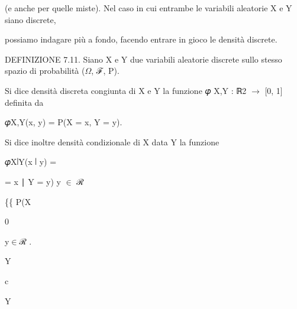 \documentclass[a4paper,portrait,12pt]{article}
\begin{document}
\begin{flushleft}
(e anche per quelle miste). Nel caso in cui entrambe le variabili aleatorie X e Y siano discrete,
\end{flushleft}


\begin{flushleft}
possiamo indagare più a fondo, facendo entrare in gioco le densit\`{a} discrete.
\end{flushleft}


\begin{flushleft}
DEFINIZIONE 7.11. Siano X e Y due variabili aleatorie discrete sullo stesso spazio di probabilit\`{a} ($\Omega$, ℱ, P).
\end{flushleft}


\begin{flushleft}
Si dice densit\`{a} discreta congiunta di X e Y la funzione 𝜑 X,Y : ℝ2 $\rightarrow$ [0, 1] definita da
\end{flushleft}


\begin{flushleft}
𝜑X,Y(x, y) = P(X = x, Y = y).
\end{flushleft}


\begin{flushleft}
Si dice inoltre densit\`{a} condizionale di X data Y la funzione
\end{flushleft}


\begin{flushleft}
𝜑X∣Y(x ∣ y) =
\end{flushleft}





\begin{flushleft}
= x ∣ Y = y) y $\in$ ℛ
\end{flushleft}


\begin{flushleft}
\{\{ P(X
\end{flushleft}


0


\begin{flushleft}
y$\in$ℛ .
\end{flushleft}


\begin{flushleft}
Y
\end{flushleft}


\begin{flushleft}
c
\end{flushleft}


\begin{flushleft}
Y
\end{flushleft}
\end{document}
